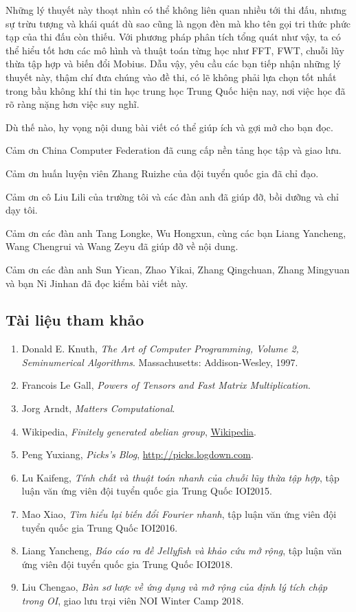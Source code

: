 \documentclass[11pt]{article}
\begin{document}
Những lý thuyết này thoạt nhìn có thể không liên quan nhiều tới thi đấu, nhưng
sự trừu tượng và khái quát dù sao cũng là ngọn đèn mà kho tên gọi tri thức phức
tạp của thi đấu còn thiếu. Với phương pháp phân tích tổng quát như vậy, ta có
thể hiểu tốt hơn các mô hình và thuật toán từng học như FFT, FWT, chuỗi lũy
thừa tập hợp và biến đổi Mobius. Dẫu vậy, yêu cầu các bạn tiếp nhận những lý
thuyết này, thậm chí đưa chúng vào đề thi, có lẽ không phải lựa chọn tốt nhất
trong bầu không khí thi tin học trung học Trung Quốc hiện nay, nơi việc học đã
rõ ràng nặng hơn việc suy nghĩ.

Dù thế nào, hy vọng nội dung bài viết có thể giúp ích và gợi mở cho bạn đọc.

Cảm ơn China Computer Federation đã cung cấp nền tảng học tập và giao lưu.

Cảm ơn huấn luyện viên Zhang Ruizhe của đội tuyển quốc gia đã chỉ đạo.

Cảm ơn cô Liu Lili của trường tôi và các đàn anh đã giúp đỡ, bồi dưỡng và chỉ
dạy tôi.

Cảm ơn các đàn anh Tang Longke, Wu Hongxun, cùng các bạn Liang Yancheng, Wang
Chengrui và Wang Zeyu đã giúp đỡ về nội dung.

Cảm ơn các đàn anh Sun Yican, Zhao Yikai, Zhang Qingchuan, Zhang Mingyuan và
bạn Ni Jinhan đã đọc kiểm bài viết này.

\subsection*{Tài liệu tham khảo}

\begin{enumerate}
  \item Donald E. Knuth, \emph{The Art of Computer Programming, Volume 2,
  Seminumerical Algorithms}. Massachusetts: Addison-Wesley, 1997.
  \item Francois Le Gall, \emph{Powers of Tensors and Fast Matrix
  Multiplication}.
  \item Jorg Arndt, \emph{Matters Computational}.
  \item Wikipedia, \emph{Finitely generated abelian group},
  \href{https://en.wikipedia.org/wiki/Finitely_generated_abelian_group}{Wikipedia}.
  \item Peng Yuxiang, \emph{Picks's Blog}, \url{http://picks.logdown.com}.
  \item Lu Kaifeng, \emph{Tính chất và thuật toán nhanh của chuỗi lũy thừa tập
  hợp}, tập luận văn ứng viên đội tuyển quốc gia Trung Quốc IOI2015.
  \item Mao Xiao, \emph{Tìm hiểu lại biến đổi Fourier nhanh}, tập luận văn ứng
  viên đội tuyển quốc gia Trung Quốc IOI2016.
  \item Liang Yancheng, \emph{Báo cáo ra đề Jellyfish và khảo cứu mở rộng}, tập
  luận văn ứng viên đội tuyển quốc gia Trung Quốc IOI2018.
  \item Liu Chengao, \emph{Bàn sơ lược về ứng dụng và mở rộng của định lý tích
  chập trong OI}, giao lưu trại viên NOI Winter Camp 2018.
\end{enumerate}
\end{document}

